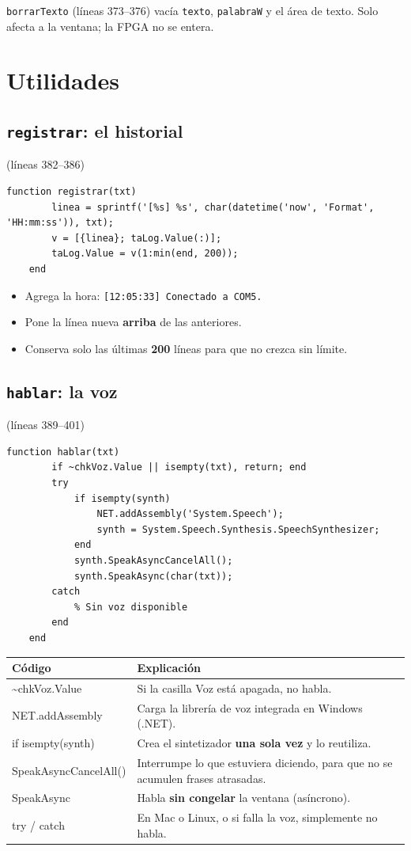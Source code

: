 \documentclass[11pt,a4paper]{article}
\newcommand{\linea}[1]{\textcolor{gris}{\small(líneas #1)}}
\newcommand{\cod}[1]{\texttt{#1}}
\begin{document}
\cod{borrarTexto} (líneas 373--376) vacía \cod{texto}, \cod{palabraW} y el área de
texto. Solo afecta a la ventana; la FPGA no se entera.

\section{Utilidades}

\subsection{\texttt{registrar}: el historial}
\linea{382--386}
\begin{lstlisting}[firstnumber=382]
    function registrar(txt)
        linea = sprintf('[%s] %s', char(datetime('now', 'Format', 'HH:mm:ss')), txt);
        v = [{linea}; taLog.Value(:)];
        taLog.Value = v(1:min(end, 200));
    end
\end{lstlisting}
\begin{itemize}
  \item Agrega la hora: \cod{[12:05:33] Conectado a COM5.}
  \item Pone la línea nueva \textbf{arriba} de las anteriores.
  \item Conserva solo las últimas \textbf{200} líneas para que no crezca sin límite.
\end{itemize}

\subsection{\texttt{hablar}: la voz}
\linea{389--401}
\begin{lstlisting}[firstnumber=389]
    function hablar(txt)
        if ~chkVoz.Value || isempty(txt), return; end
        try
            if isempty(synth)
                NET.addAssembly('System.Speech');
                synth = System.Speech.Synthesis.SpeechSynthesizer;
            end
            synth.SpeakAsyncCancelAll();
            synth.SpeakAsync(char(txt));
        catch
            % Sin voz disponible
        end
    end
\end{lstlisting}
\begin{longtable}{>{\ttfamily}p{4.6cm} p{9.5cm}}
\toprule
\normalfont\textbf{Código} & \textbf{Explicación} \\
\midrule
\endhead
\textasciitilde chkVoz.Value & Si la casilla Voz está apagada, no habla. \\
NET.addAssembly & Carga la librería de voz integrada en Windows (.NET). \\
if isempty(synth) & Crea el sintetizador \textbf{una sola vez} y lo reutiliza. \\
SpeakAsyncCancelAll() & Interrumpe lo que estuviera diciendo, para que no se acumulen frases atrasadas. \\
SpeakAsync & Habla \textbf{sin congelar} la ventana (asíncrono). \\
try / catch & En Mac o Linux, o si falla la voz, simplemente no habla. \\
\bottomrule
\end{longtable}
\end{document}
